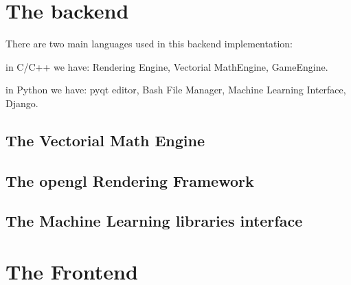 \pagebreak



\part*{The backend}

  There are two main languages used in this backend implementation:


  in C/C++  we have: Rendering Engine, Vectorial MathEngine, GameEngine.

  in Python we have: pyqt editor, Bash File Manager, Machine Learning Interface, Django.

  \chapter*{The Vectorial Math Engine}
  

  \chapter*{The opengl Rendering Framework}
  

  \chapter*{The Machine Learning libraries interface}
  

\part*{The Frontend}



  




    \pagebreak
